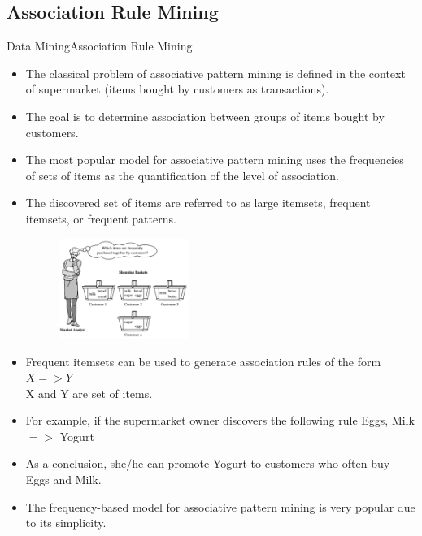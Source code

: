 \documentclass[10pt]{beamer}
\begin{document}
\subsection{Association Rule Mining}
\begin{frame}{Data Mining}{Association Rule Mining}
\begin{itemize}
\item The classical problem of associative pattern mining is defined in the context of
supermarket (items bought by customers as transactions).
\item The goal is to determine association between groups of items bought by customers.
\item The most popular model for associative pattern mining uses the frequencies of sets of
items as the quantification of the level of association.
\item The discovered set of items are referred to as large itemsets, frequent itemsets, or
frequent patterns.
\begin{figure}[H]
	\centering
	\includegraphics[width=0.4\textwidth]{images/Association.PNG}
	\label{fig:Classification}
\end{figure}
\end{itemize}
\end{frame}
\begin{frame}
\begin{itemize}
\item Frequent itemsets can be used to generate association rules of the form
$X => Y$\\
X and Y are set of items.
\item For example, if the supermarket owner discovers the following rule
{Eggs, Milk} $=>$ {Yogurt}
\item As a conclusion, she/he can promote Yogurt to customers who often buy Eggs and Milk.
\item The frequency-based model for associative pattern mining is very popular due to its
simplicity.

\end{itemize}
\end{frame}
\end{document}
